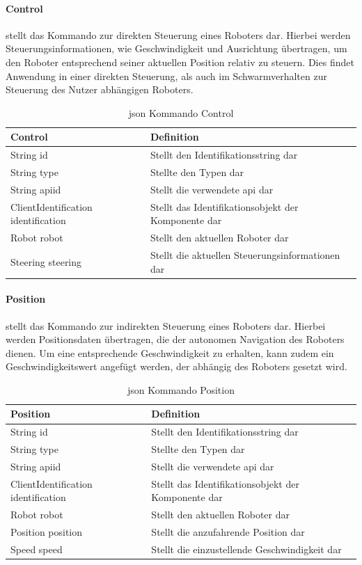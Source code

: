 \newpage
\paragraph{Control} stellt das Kommando zur direkten Steuerung eines Roboters dar. Hierbei werden Steuerungsinformationen, wie Geschwindigkeit und Ausrichtung übertragen, um den Roboter entsprechend seiner aktuellen Position relativ zu steuern. Dies findet Anwendung in einer direkten Steuerung, als auch im Schwarmverhalten zur Steuerung des Nutzer abhängigen Roboters.

\begin{table}[h]
	\centering
	\begin{tabular}{|p{4cm}|p{8cm}|}
		\hline
		\textbf{Control} & Definition\\
		\hline
		String id & Stellt den Identifikationsstring dar \\
		String type & Stellte den Typen dar \\
		String apiid & Stellt die verwendete \gls{api} dar \\
		ClientIdentification identification & Stellt das Identifikationsobjekt der Komponente dar \\
		Robot robot & Stellt den aktuellen Roboter dar\\
		Steering steering & Stellt die aktuellen Steuerungsinformationen dar \\
		\hline
	\end{tabular}
	\caption[\gls{json} Kommando Control]{\gls{json} Kommando Control}
	\label{tab:Control}
\end{table}

\paragraph{Position} stellt das Kommando zur indirekten Steuerung eines Roboters dar. Hierbei werden Positionsdaten übertragen, die der autonomen Navigation des Roboters dienen. Um eine entsprechende Geschwindigkeit zu erhalten, kann zudem ein Geschwindigkeitswert angefügt werden, der abhängig des Roboters gesetzt wird.

\begin{table}[h]
	\centering
	\begin{tabular}{|p{4cm}|p{8cm}|}
		\hline
		\textbf{Position} & Definition\\
		\hline
		String id & Stellt den Identifikationsstring dar \\
		String type & Stellte den Typen dar \\
		String apiid & Stellt die verwendete \gls{api} dar \\
		ClientIdentification identification & Stellt das Identifikationsobjekt der Komponente dar \\
		Robot robot & Stellt den aktuellen Roboter dar\\
		Position position &  Stellt die anzufahrende Position dar\\
		Speed speed & Stellt die einzustellende Geschwindigkeit dar\\
		\hline
	\end{tabular}
	\caption[\gls{json} Kommando Position]{\gls{json} Kommando Position}
	\label{tab:Position}
\end{table}